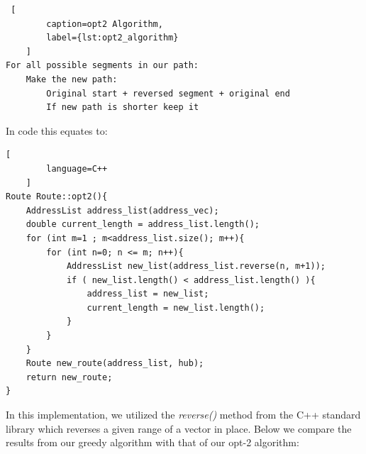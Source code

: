 \documentclass[letterpaper]{article}
\begin{document}
    \begin{lstlisting} [
        caption=opt2 Algorithm,
        label={lst:opt2_algorithm}
    ]
For all possible segments in our path:
    Make the new path:
        Original start + reversed segment + original end 
        If new path is shorter keep it\end{lstlisting}

        In code this equates to:
        \newpage 
    \begin{lstlisting}[
        language=C++
    ]
Route Route::opt2(){
    AddressList address_list(address_vec);
    double current_length = address_list.length();
    for (int m=1 ; m<address_list.size(); m++){
        for (int n=0; n <= m; n++){
            AddressList new_list(address_list.reverse(n, m+1));
            if ( new_list.length() < address_list.length() ){        
                address_list = new_list;
                current_length = new_list.length();
            } 
        }
    }
    Route new_route(address_list, hub);
    return new_route;
}
\end{lstlisting}

    In this implementation, we utilized the \emph{reverse()} method 
    from the C++ standard library which reverses a given range of a vector 
    in place. Below we compare the results from our greedy algorithm 
    with that of our opt-2 algorithm:
\end{document}
